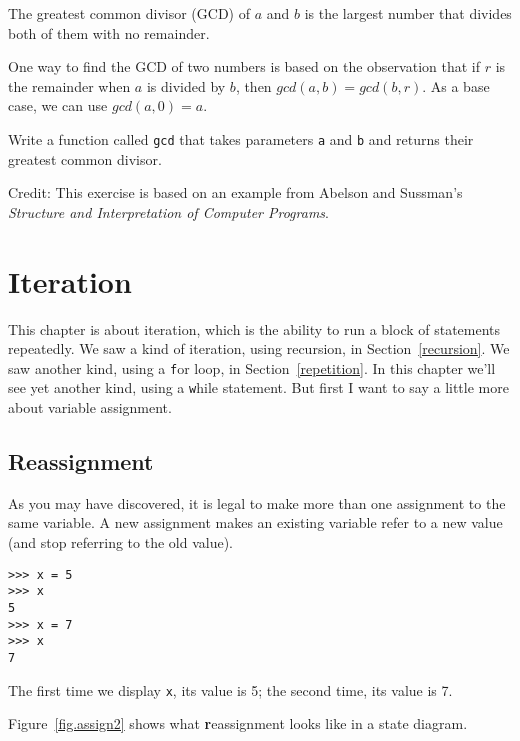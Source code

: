 \documentclass[
DIV=11,
fontsize=12,
twoside,
headinclude=false,
titlepage=firstiscover,
abstract=true,
headsepline=true,
footsepline=true,
chapterprefix=true, %
headings=big,
bibliography=totoc,%
captions=tableheading
]{scrbook}
\theoremstyle{definition}
\begin{document}
\begin{exercise}
\normalfont
{}

The greatest common divisor (GCD) of $a$ and $b$ is the largest number
that divides both of them with no remainder.  

One way to find the GCD of two numbers is based on the observation
that if $r$ is the remainder when $a$ is divided by $b$, then $gcd(a,
b) = gcd(b, r)$.  As a base case, we can use $gcd(a, 0) = a$.

Write a function called
\verb"gcd" that takes parameters {\texttt a} and {\texttt b}
and returns their greatest common divisor.

Credit: This exercise is based on an example from Abelson and
Sussman's {\em Structure and Interpretation of Computer Programs}.

\end{exercise}


\chapter{Iteration}

This chapter is about iteration, which is the ability to run
a block of statements repeatedly.  We saw a kind of iteration,
using recursion, in Section~\ref{recursion}.
We saw another kind, using a {\texttt for} loop,
in Section~\ref{repetition}.  In this chapter we'll see yet another
kind, using a {\texttt while} statement.
But first I want to say a little more about variable assignment.


\section{Reassignment}

As you may have discovered, it is legal to make more than one
assignment to the same variable.  A new assignment makes an existing
variable refer to a new value (and stop referring to the old value).

\begin{lstlisting}
>>> x = 5
>>> x
5
>>> x = 7
>>> x
7
\end{lstlisting}
%
The first time we display 
{\texttt x}, its value is 5; the second time, its
value is 7.

Figure~\ref{fig.assign2} shows what {\textbf reassignment} looks
like in a state diagram.  
\end{document}
